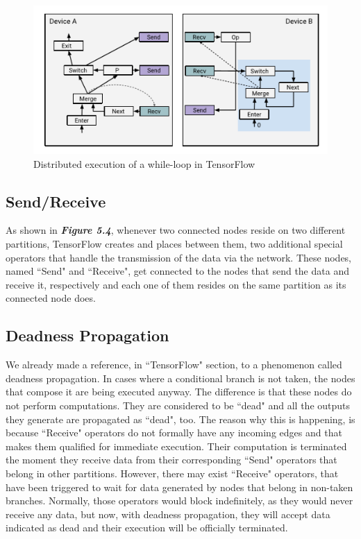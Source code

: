 \documentclass[ack,preface]{dithesis}
\begin{document}
\begin{figure}
\centering
\includegraphics[scale=1.2]{figures/sm_iteration}
\caption{Distributed execution of a while-loop in TensorFlow}
\end{figure}


    \subsection{Send/Receive}
As shown in \textit{\textbf{Figure 5.4}}, whenever two connected nodes  reside on two different partitions, TensorFlow creates and places between them, two additional special operators that handle the transmission of the data via the network. These nodes, named ``Send"  and ``Receive", get connected to the nodes that send the data and receive it, respectively and each one of them resides on the same partition as its connected node does. 


    \subsection{Deadness Propagation}
We already made a reference, in ``TensorFlow" section, to a phenomenon called deadness propagation. In cases where a conditional branch is not taken, the nodes that compose it are being executed anyway. The difference is that these nodes do not perform computations. They are considered to be ``dead" and all the outputs they generate are propagated as ``dead", too. 
The reason why this is happening, is  because ``Receive" operators do not formally have any incoming edges and that makes them qualified for immediate execution. Their computation is terminated the moment they receive data from their corresponding ``Send" operators that belong in other partitions. However, there may exist ``Receive" operators, that have been triggered to wait for data generated by nodes that belong in non-taken branches. Normally, those operators would block indefinitely, as they would never receive any data, but now, with deadness propagation, they will accept data  indicated as dead and their execution will be officially terminated.
\end{document}
